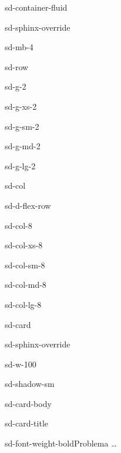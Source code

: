 \documentclass[letterpaper,10pt,italian]{jupyterBook}
\begin{document}
\begin{sphinxuseclass}{sd-container-fluid}
\begin{sphinxuseclass}{sd-sphinx-override}
\begin{sphinxuseclass}{sd-mb-4}
\begin{sphinxuseclass}{sd-row}
\begin{sphinxuseclass}{sd-g-2}
\begin{sphinxuseclass}{sd-g-xs-2}
\begin{sphinxuseclass}{sd-g-sm-2}
\begin{sphinxuseclass}{sd-g-md-2}
\begin{sphinxuseclass}{sd-g-lg-2}
\begin{sphinxuseclass}{sd-col}
\begin{sphinxuseclass}{sd-d-flex-row}
\begin{sphinxuseclass}{sd-col-8}
\begin{sphinxuseclass}{sd-col-xs-8}
\begin{sphinxuseclass}{sd-col-sm-8}
\begin{sphinxuseclass}{sd-col-md-8}
\begin{sphinxuseclass}{sd-col-lg-8}
\begin{sphinxuseclass}{sd-card}
\begin{sphinxuseclass}{sd-sphinx-override}
\begin{sphinxuseclass}{sd-w-100}
\begin{sphinxuseclass}{sd-shadow-sm}
\begin{sphinxuseclass}{sd-card-body}
\begin{sphinxuseclass}{sd-card-title}
\begin{sphinxuseclass}{sd-font-weight-bold}Problema …
\end{sphinxuseclass}
\end{sphinxuseclass}
\end{sphinxuseclass}
\end{sphinxuseclass}
\end{sphinxuseclass}
\end{sphinxuseclass}
\end{sphinxuseclass}
\end{sphinxuseclass}
\end{sphinxuseclass}
\end{sphinxuseclass}
\end{sphinxuseclass}
\end{sphinxuseclass}
\end{sphinxuseclass}
\end{sphinxuseclass}

\end{sphinxuseclass}
\end{sphinxuseclass}
\end{sphinxuseclass}
\end{sphinxuseclass}
\end{sphinxuseclass}
\end{sphinxuseclass}
\end{sphinxuseclass}
\end{sphinxuseclass}
\end{sphinxuseclass}
\end{document}
